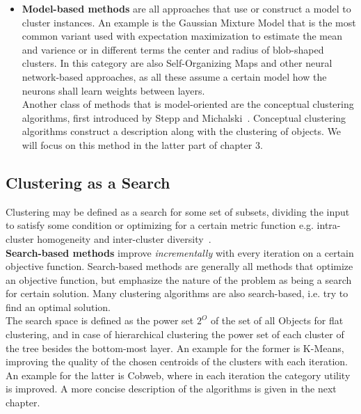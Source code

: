 \begin{itemize}
    \item \textbf{Model-based methods} are all approaches that use or construct a model to cluster instances. An example is the Gaussian Mixture Model that is the most common variant used with expectation maximization to estimate the mean and varience or in different terms the center and radius of blob-shaped clusters. In this category are also Self-Organizing Maps and other neural network-based approaches, as all these assume a certain model how the neurons shall learn weights between layers.  \\
    Another class of methods that is model-oriented are the conceptual clustering algorithms, first introduced by Stepp and Michalski~\cite{michalski1983learning}. Conceptual clustering algorithms construct a description along with the clustering of objects. We will focus on this method in the latter part of chapter 3.
\end{itemize}


\subsection{Clustering as a Search}\label{\positionnumber}
Clustering may be defined as a search for some set of subsets, dividing the input to satisfy some condition or optimizing for a certain metric function e.g. intra-cluster homogeneity and inter-cluster diversity~\cite{Fisher1987}. \\
\textbf{Search-based methods} improve \textit{incrementally} with every iteration on a certain objective function. Search-based methods are generally all methods that optimize an objective function, but emphasize the nature of the problem as being a search for certain solution. Many clustering algorithms are also search-based, i.e. try to find an optimal solution. \\
The search space is defined as the power set $2^O$ of the set of all Objects for flat clustering, and in case of hierarchical clustering the power set of each cluster of the tree besides the bottom-most layer. An example for the former is K-Means, improving the quality of the chosen centroids of the clusters with each iteration. An example for the latter is Cobweb, where in each iteration the category utility is improved. A more concise description of the algorithms is given in the next chapter.

